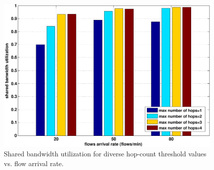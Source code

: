\begin{figure}[t]
\begin{center}
\includegraphics[width=1\linewidth]{results/hops_vs_BW.pdf}
\caption{Shared bandwidth utilization for diverse hop-count threshold values vs. flow arrival rate.}
\label{fig:hop_count}
\end{center}
\end{figure}

